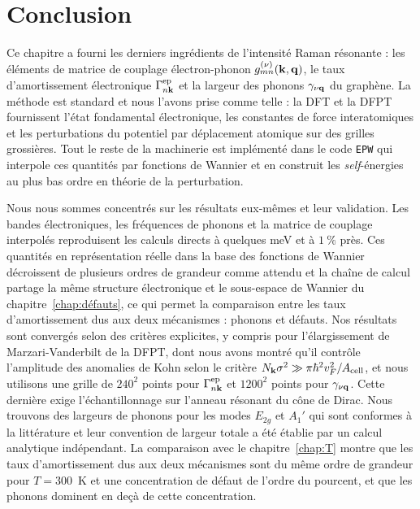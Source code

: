 \section{Conclusion}\label{sec:g_conclusion}

Ce chapitre a fourni les derniers ingrédients de l'intensité Raman résonante : les éléments de matrice de couplage électron-phonon $g^{(\nu)}_{mn}(\mathbf{k},\mathbf{q})$, le taux d'amortissement électronique $\Gamma^\text{ep}_{n\mathbf{k}}$ et la largeur des phonons $\gamma_{\nu\mathbf{q}}$ du graphène. La méthode est standard et nous l'avons prise comme telle : la DFT et la DFPT fournissent l'état fondamental électronique, les constantes de force interatomiques et les perturbations du potentiel par déplacement atomique sur des grilles grossières. Tout le reste de la machinerie est implémenté dans le code \texttt{EPW} qui interpole ces quantités par fonctions de Wannier et en construit les \textit{self}-énergies au plus bas ordre en théorie de la perturbation.

Nous nous sommes concentrés sur les résultats eux-mêmes et leur validation. Les bandes électroniques, les fréquences de phonons et la matrice de couplage interpolés reproduisent les calculs directs à quelques meV et à $1~\%$ près. Ces quantités en représentation réelle dans la base des fonctions de Wannier décroissent de plusieurs ordres de grandeur comme attendu et la chaîne de calcul partage la même structure électronique et le sous-espace de Wannier du chapitre~\ref{chap:défauts}, ce qui permet la comparaison entre les taux d'amortissement dus aux deux mécanismes : phonons et défauts. Nos résultats sont convergés selon des critères explicites, y compris pour l'élargissement de Marzari-Vanderbilt de la DFPT, dont nous avons montré qu'il contrôle l'amplitude des anomalies de Kohn selon le critère $N_{\mathbf{k}}\sigma^2\gg\pi\hbar^2v_F^2/A_\text{cell}$, et nous utilisons une grille de $240^2$ points pour $\Gamma_{n\mathbf{k}}^\text{ep}$ et $1200^2$ points pour $\gamma_{\nu\mathbf{q}}$. Cette dernière exige l'échantillonnage sur l'anneau résonant du cône de Dirac. Nous trouvons des largeurs de phonons pour les modes $E_{2g}$ et $A_1'$ qui sont conformes à la littérature et leur convention de largeur totale a été établie par un calcul analytique indépendant. La comparaison avec le chapitre~\ref{chap:T} montre que les taux d'amortissement dus aux deux mécanismes sont du même ordre de grandeur pour $T=300$~K et une concentration de défaut de l'ordre du pourcent, et que les phonons dominent en deçà de cette concentration.

